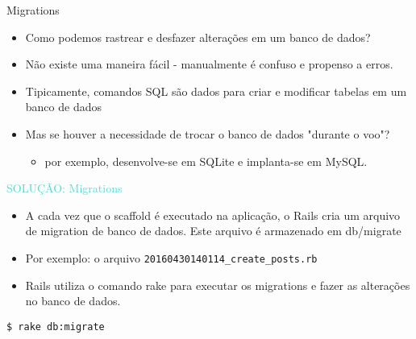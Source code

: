 \begin{frame}{Migrations}
	
		
	\begin{itemize}
		\item \alert{Como podemos rastrear e desfazer alterações em um banco de dados?}
		\item Não existe uma maneira fácil - manualmente é confuso e propenso a erros.
		\item Tipicamente, comandos SQL são dados para criar e modificar tabelas em um
		banco de dados
		\item Mas se houver a necessidade de trocar o banco de dados "durante o voo"?
		\begin{itemize}
		  \item por exemplo, desenvolve-se em SQLite e implanta-se em MySQL.
		\end{itemize}
	\end{itemize}
	
	\begin{center}
		\textcolor{Turquoise}{{\huge SOLUÇÃO: Migrations}}
	\end{center}
	
	\framebreak
	
	\begin{itemize}
		\item A cada vez que o \alert{scaffold} é executado na aplicação, o Rails cria um
		arquivo de \alert{migration} de banco de dados. Este arquivo é armazenado em \alert{db/migrate}
		\item Por exemplo: o arquivo \verb|20160430140114_create_posts.rb|
	\end{itemize}
	  
	
	
	\begin{itemize}
		\item Rails utiliza o comando \alert{rake} para executar os \alert{migrations} e fazer as alterações
		no banco de dados.
	\end{itemize}
	
	\begin{lstlisting}[style=BashInputBasicStyle]
		$ rake db:migrate
	\end{lstlisting}
	
\end{frame}